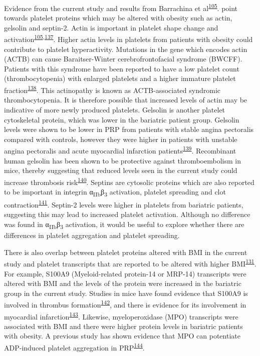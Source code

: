 \documentclass[11pt,twoside]{bristolthesis}
\begin{document}
Evidence from the current study and results from Barrachina et al\textsuperscript{\protect\hyperlink{ref-Barrachina2019}{105}}. point towards platelet proteins which may be altered with obesity such as actin, gelsolin and septin-2. Actin is important in platelet shape change and activation\textsuperscript{\protect\hyperlink{ref-Barrachina2019}{105},\protect\hyperlink{ref-Bearer2002}{137}}. Higher actin levels in platelets from patients with obesity could contribute to platelet hyperactivity. Mutations in the gene which encodes actin (ACTB) can cause Baraitser-Winter cerebrofrontofacial syndrome (BWCFF). Patients with this syndrome have been reported to have a low platelet count (thrombocytopenia) with enlarged platelets and a higher immature platelet fraction\textsuperscript{\protect\hyperlink{ref-Latham2018}{138}}. This actinopathy is known as ACTB-associated syndromic thrombocytopenia. It is therefore possible that increased levels of actin may be indicative of more newly produced platelets. Gelsolin is another platelet cytoskeletal protein, which was lower in the bariatric patient group. Gelsolin levels were shown to be lower in PRP from patients with stable angina pectoralis compared with controls, however they were higher in patients with unstable angina pectoralis and acute myocardial infarction patients\textsuperscript{\protect\hyperlink{ref-Yue2011}{139}}. Recombinant human gelsolin has been shown to be protective against thromboembolism in mice, thereby suggesting that reduced levels seen in the current study could increase thrombosis risk\textsuperscript{\protect\hyperlink{ref-Gupta2019}{140}}. Septins are cytosolic proteins which are also reported to be important in integrin α\textsubscript{IIb}β\textsubscript{3} activation, platelet spreading and clot contraction\textsuperscript{\protect\hyperlink{ref-Kim2020}{141}}. Septin-2 levels were higher in platelets from bariatric patients, suggesting this may lead to increased platelet activation. Although no difference was found in α\textsubscript{IIb}β\textsubscript{3} activation, it would be useful to explore whether there are differences in platelet aggregation and platelet spreading.

There is also overlap between platelet proteins altered with BMI in the current study and platelet transcripts that are reported to be altered with higher BMI\textsuperscript{\protect\hyperlink{ref-Freedman2010}{131}}. For example, S100A9 (Myeloid-related protein-14 or MRP-14) transcripts were altered with BMI and the levels of the protein were increased in the bariatric group in the current study. Studies in mice have found evidence that S100A9 is involved in thrombus formation\textsuperscript{\protect\hyperlink{ref-Wang2014a}{142}}, and there is evidence for its involvement in myocardial infarction\textsuperscript{\protect\hyperlink{ref-Cai2020}{143}}. Likewise, myeloperoxidase (MPO) transcripts were associated with BMI and there were higher protein levels in bariatric patients with obesity. A previous study has shown evidence that MPO can potentiate ADP-induced platelet aggregation in PRP\textsuperscript{\protect\hyperlink{ref-Gorudko2013}{144}}.
\end{document}
